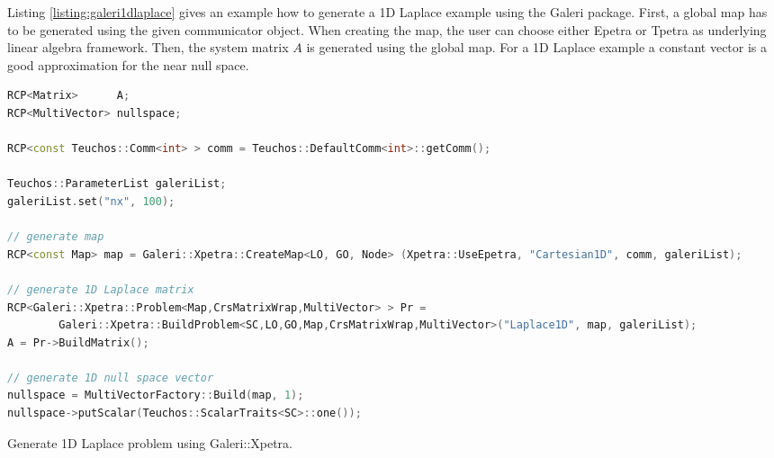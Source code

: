 \documentclass[12pt,a4paper]{article}
\begin{document}
Listing \ref{listing:galeri1dlaplace} gives an example how to generate a 1D Laplace example using the Galeri package. First, a global map has to be generated using the given communicator object. When creating the map, the user can choose either Epetra or Tpetra as underlying linear algebra framework. Then, the system matrix $A$ is generated using the global map. For a 1D Laplace example a constant vector is a good approximation for the near null space.
\begin{Listing} 
\begin{center} 
\begin{lstlisting}[language=C++,label=listing:galeri1dlaplace]
RCP<Matrix>      A;
RCP<MultiVector> nullspace;

RCP<const Teuchos::Comm<int> > comm = Teuchos::DefaultComm<int>::getComm();

Teuchos::ParameterList galeriList;
galeriList.set("nx", 100);
    
// generate map
RCP<const Map> map = Galeri::Xpetra::CreateMap<LO, GO, Node> (Xpetra::UseEpetra, "Cartesian1D", comm, galeriList);

// generate 1D Laplace matrix
RCP<Galeri::Xpetra::Problem<Map,CrsMatrixWrap,MultiVector> > Pr =
        Galeri::Xpetra::BuildProblem<SC,LO,GO,Map,CrsMatrixWrap,MultiVector>("Laplace1D", map, galeriList);
A = Pr->BuildMatrix();

// generate 1D null space vector
nullspace = MultiVectorFactory::Build(map, 1);
nullspace->putScalar(Teuchos::ScalarTraits<SC>::one());
\end{lstlisting}
\caption{Generate 1D Laplace problem using Galeri::Xpetra.} 
\label{listing:galeri1dlaplace}
\end{center}
\end{Listing}
\end{document}
